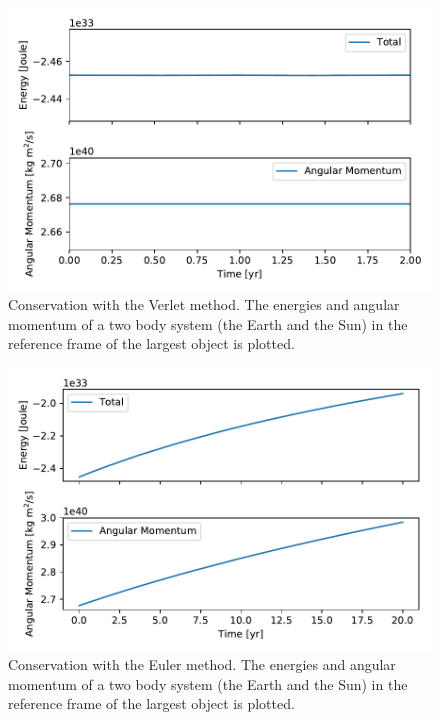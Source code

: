 \documentclass[10pt]{article}
\begin{document}
\begin{multicols}{2}
\begin{figure}[htpb]
    \centering
    \includegraphics[width=0.8\linewidth]{energy_conservation_verlet.pdf}
    \caption{Conservation with the Verlet method. The energies and
        angular momentum of a two body system (the Earth and the Sun) in
        the reference frame of the largest object is plotted.}
    \label{fig:energy_verlet}
\end{figure}


\begin{figure}[H]
    \centering
    \includegraphics[width=0.8\linewidth]{energy_conservation_euler.pdf}
    \caption{Conservation with the Euler method. The energies and angular
        momentum of a two body system (the
    Earth and the Sun) in the reference frame of the largest object is
plotted.}
    \label{fig:energy_euler}
\end{figure}


\end{multicols}
\end{document}
